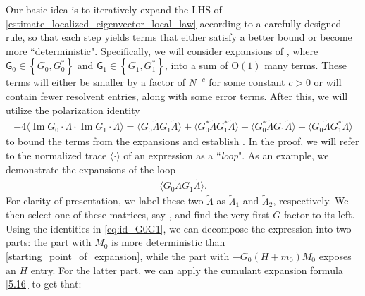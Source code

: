 \documentclass[10pt,reqno]{amsart}
\numberwithin{equation}{section}
\numberwithin{figure}{section}
\theoremstyle{plain} %
\theoremstyle{definition} %
\newcommand{\wt}{\widetilde}
\newcommand{\E}{\mathbb{E}}
\newcommand{\sG}{\mathsf G}
\newcommand{\pa}[1]{\left({#1}\right)}
\newcommand{\ha}[1]{\left\{{#1}\right\}}
\newcommand{\avg}[1]{\langle #1 \rangle}
\DeclareMathOperator{\im}{\mathrm{Im}}
\newcommand{\tLambda}{{\wt{\Lambda}}}
\newcommand{\OO}{\mathrm{O}}
\numberwithin{equation}{section}
\begin{document}
Our basic idea is to iteratively expand the LHS of \eqref{estimate_localized_eigenvector_local_law} according to a carefully designed rule, so that each step yields terms that either satisfy a better bound or become more ``deterministic". 
Specifically, we will consider expansions of \smash{\(\E\avg{\sG_0\tLambda\sG_1\tLambda}\)}, 
where $\sG_0\in\ha{G_0,G_0^*}$ and $\sG_1\in\ha{G_1,G_1^*}$, into a sum of $\OO(1)$ many terms. These terms will either be smaller by a factor of $N^{-c}$ for some constant $c>0$ or will contain fewer resolvent entries, along with some error terms.
After this, we will utilize the polarization identity
\begin{equation}\label{expansion_of_im}
    \begin{aligned}
        -4\avg{\im G_0\cdot\tLambda\cdot\im G_1\cdot\tLambda}=\avg{G_0\tLambda G_1\tLambda}+\avg{G_0^*\tLambda G_1^*\tLambda}-\avg{G_0^*\tLambda G_1\tLambda}-\avg{G_0\tLambda G_1^*\tLambda}
    \end{aligned}
\end{equation}
to bound the terms from the expansions and establish . 
In the proof, we will refer to the normalized trace $\avg{\cdot}$ of an expression as a ``\emph{loop}". 
As an example, we demonstrate the expansions of the loop %
\begin{equation}\label{starting_point_of_expansion}
    \begin{aligned}
        \avg{G_0\tLambda G_1\tLambda}.
    \end{aligned}
\end{equation}
For clarity of presentation, we label these two $\tLambda$ as $\tLambda_1$ and $\tLambda_2$, respectively. We then select one of these matrices, say \smash{$\tLambda_1$}, and find the very first $G$ factor to its left. Using the identities in \eqref{eq:id_G0G1}, we can decompose the expression into two parts: the part with $M_0$ is more deterministic than \eqref{starting_point_of_expansion}, while the part with $-G_0\pa{H+m_{0}}M_0$ exposes an $H$ entry. For the latter part, we can apply the cumulant expansion formula \eqref{5.16} to get that: 
\end{document}
